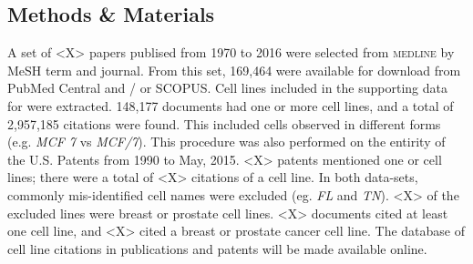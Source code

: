 \documentclass[10pt]{article}
\begin{document}
\subsection{Methods \& Materials}
A set of <X> papers publised from 1970 to 2016 were selected from \textsc{medline} by MeSH term and journal. From this set, 169,464 were available for download from PubMed Central and / or SCOPUS. Cell lines included in the supporting data for \cite{yu2015resource} were extracted. 148,177 documents had one or more cell lines, and a total of 2,957,185 citations were found. This included cells observed in different forms (e.g. \textit{MCF 7} vs \textit{MCF/7}). This procedure was also performed on the entirity of the U.S. Patents from 1990 to May, 2015. <X> patents mentioned one or cell lines; there were a total of <X> citations of a cell line. In both data-sets, commonly mis-identified cell names were excluded (eg. \textit{FL} and \textit{TN}). <X> of the excluded lines were breast or prostate cell lines. <X> documents cited at least one cell line, and <X> cited a breast or prostate cancer cell line. The database of cell line citations in publications and patents will be made available online.
\end{document}
